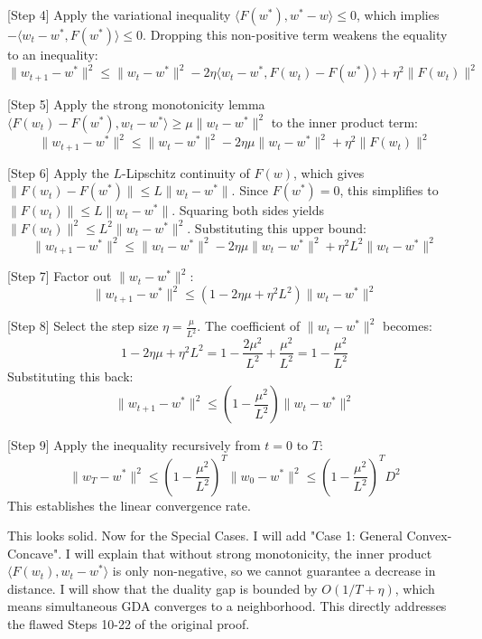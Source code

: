 \documentclass{article}
\begin{document}
[Step 4] Apply the variational inequality $\langle F(w^*), w^* - w \rangle \leq 0$, which implies $-\langle w_t - w^*, F(w^*) \rangle \leq 0$. Dropping this non-positive term weakens the equality to an inequality:
$$ \|w_{t+1} - w^*\|^2 \leq \|w_t - w^*\|^2 - 2\eta \langle w_t - w^*, F(w_t) - F(w^*) \rangle + \eta^2 \|F(w_t)\|^2 $$

[Step 5] Apply the strong monotonicity lemma $\langle F(w_t) - F(w^*), w_t - w^* \rangle \geq \mu \|w_t - w^*\|^2$ to the inner product term:
$$ \|w_{t+1} - w^*\|^2 \leq \|w_t - w^*\|^2 - 2\eta \mu \|w_t - w^*\|^2 + \eta^2 \|F(w_t)\|^2 $$

[Step 6] Apply the $L$-Lipschitz continuity of $F(w)$, which gives $\|F(w_t) - F(w^*)\| \leq L \|w_t - w^*\|$. Since $F(w^*) = 0$, this simplifies to $\|F(w_t)\| \leq L \|w_t - w^*\|$. Squaring both sides yields $\|F(w_t)\|^2 \leq L^2 \|w_t - w^*\|^2$. Substituting this upper bound:
$$ \|w_{t+1} - w^*\|^2 \leq \|w_t - w^*\|^2 - 2\eta \mu \|w_t - w^*\|^2 + \eta^2 L^2 \|w_t - w^*\|^2 $$

[Step 7] Factor out $\|w_t - w^*\|^2$:
$$ \|w_{t+1} - w^*\|^2 \leq (1 - 2\eta\mu + \eta^2 L^2) \|w_t - w^*\|^2 $$

[Step 8] Select the step size $\eta = \frac{\mu}{L^2}$. The coefficient of $\|w_t - w^*\|^2$ becomes:
$$ 1 - 2\eta\mu + \eta^2 L^2 = 1 - \frac{2\mu^2}{L^2} + \frac{\mu^2}{L^2} = 1 - \frac{\mu^2}{L^2} $$
Substituting this back:
$$ \|w_{t+1} - w^*\|^2 \leq \left(1 - \frac{\mu^2}{L^2}\right) \|w_t - w^*\|^2 $$

[Step 9] Apply the inequality recursively from $t=0$ to $T$:
$$ \|w_T - w^*\|^2 \leq \left(1 - \frac{\mu^2}{L^2}\right)^T \|w_0 - w^*\|^2 \leq \left(1 - \frac{\mu^2}{L^2}\right)^T D^2 $$
This establishes the linear convergence rate.

This looks solid.
Now for the Special Cases.
I will add "Case 1: General Convex-Concave".
I will explain that without strong monotonicity, the inner product $\langle F(w_t), w_t - w^* \rangle$ is only non-negative, so we cannot guarantee a decrease in distance.
I will show that the duality gap is bounded by $O(1/T + \eta)$, which means simultaneous GDA converges to a neighborhood.
This directly addresses the flawed Steps 10-22 of the original proof.
\end{document}
